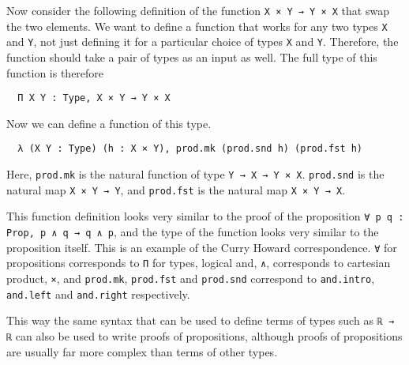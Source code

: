 \documentclass[12pt]{article} %
\theoremstyle{definition}
\theoremstyle{definition}
\theoremstyle{definition}
\theoremstyle{definition}
\theoremstyle{definition}
\theoremstyle{definition}
\begin{document}
Now consider the following definition of the function
\lstinline{X × Y → Y × X} that swap the two elements. We want to define a function
that works for any two types \lstinline{X} and \lstinline{Y}, not just defining it for
a particular choice of types \lstinline{X} and \lstinline{Y}. Therefore, the
function should take a pair of types as an input as well. The full type of this function
is therefore

\begin{lstlisting}
  Π X Y : Type, X × Y → Y × X
\end{lstlisting}

Now we can define a function of this type.

\begin{lstlisting}
  λ (X Y : Type) (h : X × Y), prod.mk (prod.snd h) (prod.fst h)
\end{lstlisting}

Here, \lstinline{prod.mk} is the natural function of type \lstinline{Y → X → Y × X}.
\lstinline{prod.snd} is the natural map \lstinline{X × Y → Y}, and \lstinline{prod.fst}
is the natural map \lstinline{X × Y → X}.

This function definition looks very similar to the proof of the proposition
\lstinline{∀ p q : Prop, p ∧ q → q ∧ p}, and the type of the function
looks very similar to the proposition itself. This is an example of the Curry Howard
correspondence. \lstinline{∀} for propositions corresponds to \lstinline{Π} for types,
logical and, \lstinline{∧}, corresponds to cartesian product, \lstinline{×}, and
\lstinline{prod.mk}, \lstinline{prod.fst} and \lstinline{prod.snd} correspond to
\lstinline{and.intro}, \lstinline{and.left} and \lstinline{and.right} respectively.

This way the same syntax that can be used to define terms of types such as \lstinline{ℝ → ℝ}
can also be used to write proofs of propositions, although proofs of propositions are usually
far more complex than terms of other types.


\end{document}
